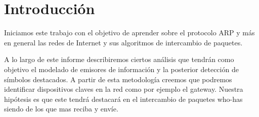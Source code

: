 \section{Introducción}

Iniciamos este trabajo con el objetivo de aprender sobre el protocolo ARP y más en general las redes de Internet y sus algoritmos de intercambio de paquetes.

A lo largo de este informe describiremos ciertos análisis que tendrán como objetivo el modelado de emisores de información y la posterior detección de símbolos destacados. A partir de esta metodología creemos que podremos identificar dispositivos claves en la red como por ejemplo el gateway. Nuestra hipótesis es que este tendrá destacará en el intercambio de paquetes who-has siendo de los que mas reciba y envíe.
